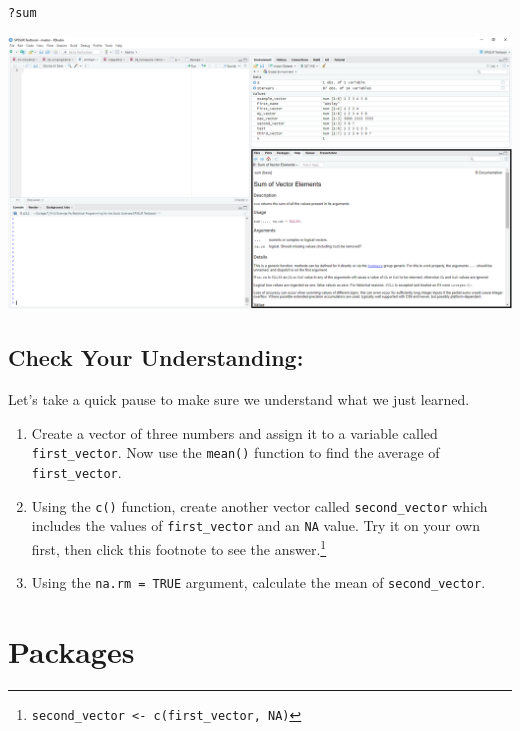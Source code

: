 \documentclass[
]{book}
\providecommand{\tightlist}{%
  \setlength{\itemsep}{0pt}\setlength{\parskip}{0pt}}
\begin{document}
\begin{verbatim}
?sum
\end{verbatim}

\includegraphics{docs/_main_files/figure-html/RStudio_Help Pane.PNG}

\hypertarget{check-your-understanding}{%
\subsection*{Check Your Understanding:}\label{check-your-understanding}}

Let's take a quick pause to make sure we understand what we just learned.

\begin{enumerate}
\def\labelenumi{\arabic{enumi}.}
\tightlist
\item
  Create a vector of three numbers and assign it to a variable called \texttt{first\_vector}. Now use the \texttt{mean()} function to find the average of \texttt{first\_vector}.
\item
  Using the \texttt{c()} function, create another vector called \texttt{second\_vector} which includes the values of \texttt{first\_vector} and an \texttt{NA} value. Try it on your own first, then click this footnote to see the answer.\footnote{\texttt{second\_vector\ \textless{}-\ c(first\_vector,\ NA)}}
\item
  Using the \texttt{na.rm\ =\ TRUE} argument, calculate the mean of \texttt{second\_vector}.
\end{enumerate}

\hypertarget{packages}{%
\section{Packages}\label{packages}}
\end{document}
